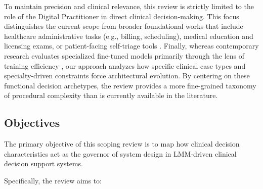 \documentclass[review,12pt]{elsarticle}
\begin{document}
To maintain precision and clinical relevance, this review is strictly limited to the role of the Digital Practitioner in direct clinical decision-making. This focus distinguishes the current scope from broader foundational works that include healthcare administrative tasks (e.g., billing, scheduling), medical education and licensing exams, or patient-facing self-triage tools \cite{alkalbani2025systematic, liang_2024, busch2025current}. Finally, whereas contemporary research evaluates specialized fine-tuned models primarily through the lens of training efficiency \cite{yang2026building}, our approach analyzes how specific clinical case types and specialty-driven constraints force architectural evolution. By centering on these functional decision archetypes, the review provides a more fine-grained taxonomy of procedural complexity than is currently available in the literature.

 

\subsection{Objectives}

The primary objective of this scoping review is to map how clinical decision characteristics act as the governor of system design in LMM-driven clinical decision support systems.

Specifically, the review aims to:
\end{document}

